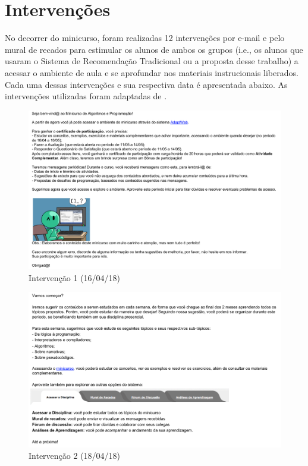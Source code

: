 \chapter{Intervenções}\label{ape:intervencoes}

No decorrer do minicurso, foram realizadas 12 intervenções por e-mail e pelo mural
de recados para estimular os alunos de ambos os grupos (i.e., os alunos que usaram o Sistema de Recomendação Tradicional
ou a proposta desse trabalho) a acessar o ambiente de aula e se aprofundar nos materiais instrucionais
liberados. Cada uma dessas intervenções e sua respectiva data é apresentada abaixo. As intervenções utilizadas foram adaptadas
de .

\begin{figure}[htb]
  \caption{\label{fig:intervencao-1}Intervenção 1 (16/04/18)}
  \begin{center}
      \includegraphics[scale=0.6]{./Figuras/intervencao-1.png}
  \end{center}
\end{figure}

\begin{figure}[htb]
  \caption{\label{fig:intervencao-2}Intervenção 2 (18/04/18)}
  \begin{center}
      \includegraphics[scale=0.6]{./Figuras/intervencao-2.png}
  \end{center}
\end{figure}

